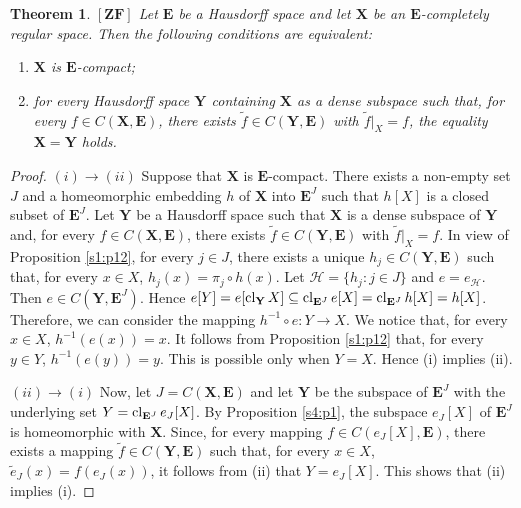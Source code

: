 \documentclass[12pt,twoside,leqno]{article}
\theoremstyle{plain}
\newtheorem{theorem}{Theorem}[section]
\theoremstyle{definition}
\theoremstyle{remark}
\DeclareMathOperator{\cl}{{\rm cl}}
\begin{document}
\begin{theorem}
	\label{s4:t2}
	$[\mathbf{ZF}]$  Let $\mathbf{E}$ be a Hausdorff space and let $\mathbf{X}$ be an $\mathbf{E}$-completely regular space. 
	Then the following conditions are equivalent:
	\begin{enumerate}
		\item[(i)] $\mathbf{X}$ is $\mathbf{E}$-compact;
		\item[(ii)] for every Hausdorff space $\mathbf{Y}$ containing $\mathbf{X}$ as a dense subspace such that, for every $f\in C(\mathbf{X},\mathbf{E})$, there exists $\tilde{f}\in C(\mathbf{Y},\mathbf{E})$ with $\tilde{f}|_X=f$, the equality $\mathbf{X}=\mathbf{Y}$ holds.
	\end{enumerate}
\end{theorem}
\begin{proof}
	$(i)\rightarrow (ii)$ Suppose that $\mathbf{X}$ is $\mathbf{E}$-compact. There exists a non-empty set $J$ and a homeomorphic embedding $h$ of $\mathbf{X}$ into  $\mathbf{E}^{J}$ such that $h[X]$ is a closed subset of $\mathbf{E}^{J}$. Let $\mathbf{Y}$ be a Hausdorff space such that $\mathbf{X}$ is a dense subspace of $\mathbf{Y}$ and, for every $f\in C(\mathbf{X},\mathbf{E})$, there exists  $\tilde{f}\in C(\mathbf{Y},\mathbf{E})$ with $\tilde{f}|_X=f$. In view of Proposition \ref{s1:p12}, for every $j\in J$, there exists a unique $h_j\in C(\mathbf{Y}, \mathbf{E})$ such that, for every $x\in X$, $h_j(x)=\pi_j\circ h(x)$. Let $\mathcal{H}=\{h_j: j\in J\}$ and $e=e_{\mathcal{H}}$. Then $e\in C(\mathbf{Y}, \mathbf{E}^J)$. Hence $e[Y]=e[\cl_{\mathbf{Y}} X]\subseteq \cl_{\mathbf{E}^J} e[X]=\cl_{\mathbf{E}^J} h[X]=h[X]$. Therefore, we can consider the mapping $h^{-1}\circ e: Y\to X$. We notice that, for every $x\in X$, $h^{-1}(e(x))=x$. It follows from Proposition \ref{s1:p12} that, for every $y\in Y$,  $h^{-1}(e(y))=y$. This is possible only when $Y=X$. Hence (i) implies (ii).
	
	$(ii)\rightarrow (i)$ Now, let $J=C(\mathbf{X}, \mathbf{E})$ and let $\mathbf{Y}$ be the subspace of $\mathbf{E}^{J}$ with the underlying set $Y=\cl_{\mathbf{E}^J}e_J[X]$. By Proposition \ref{s4:p1}, the subspace $e_J[X]$ of $\mathbf{E}^J$ is homeomorphic with $\mathbf{X}$.  Since, for every mapping $f\in C(e_J[X], \mathbf{E})$, there exists a mapping $\tilde{f}\in C(\mathbf{Y}, \mathbf{E})$ such that, for every $x\in X$, $\tilde e_J(x)= f(e_J(x))$, it follows from (ii) that $Y=e_J[X]$. This shows that (ii) implies (i).
\end{proof}
\end{document}
